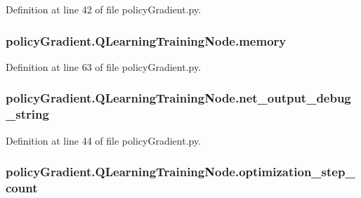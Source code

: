 Definition at line 42 of file policy\+Gradient.\+py.

\subsubsection[{\texorpdfstring{memory}{memory}}]{\setlength{\rightskip}{0pt plus 5cm}policy\+Gradient.\+Q\+Learning\+Training\+Node.\+memory}\hypertarget{classpolicy_gradient_1_1_q_learning_training_node_a53bbbfbaf28450f564b880da5e1bb9f1}{}\label{classpolicy_gradient_1_1_q_learning_training_node_a53bbbfbaf28450f564b880da5e1bb9f1}


Definition at line 63 of file policy\+Gradient.\+py.

\subsubsection[{\texorpdfstring{net\+\_\+output\+\_\+debug\+\_\+string}{net_output_debug_string}}]{\setlength{\rightskip}{0pt plus 5cm}policy\+Gradient.\+Q\+Learning\+Training\+Node.\+net\+\_\+output\+\_\+debug\+\_\+string}\hypertarget{classpolicy_gradient_1_1_q_learning_training_node_a5bf8abe5bd8b8bb5a4e75479ba173ccc}{}\label{classpolicy_gradient_1_1_q_learning_training_node_a5bf8abe5bd8b8bb5a4e75479ba173ccc}


Definition at line 44 of file policy\+Gradient.\+py.

\subsubsection[{\texorpdfstring{optimization\+\_\+step\+\_\+count}{optimization_step_count}}]{\setlength{\rightskip}{0pt plus 5cm}policy\+Gradient.\+Q\+Learning\+Training\+Node.\+optimization\+\_\+step\+\_\+count}\hypertarget{classpolicy_gradient_1_1_q_learning_training_node_a002593796d45dbad4638e691e71d4b19}{}\label{classpolicy_gradient_1_1_q_learning_training_node_a002593796d45dbad4638e691e71d4b19}


